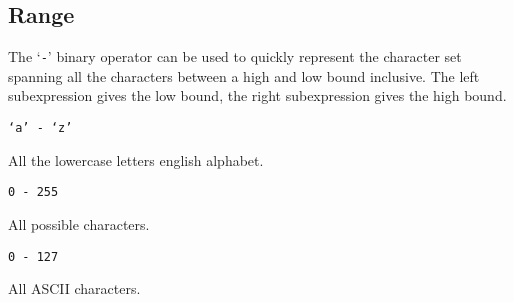 
\subsection{Range}
{
	The `\texttt{-}' binary operator can be used to quickly represent the
	character set
	spanning all the characters between a high and low bound inclusive.
	The left subexpression gives the low bound, the right subexpression gives
	the high bound.
	
	\begin{itemize}
	{
		\item \texttt{`a' - `z'}
		
			All the lowercase letters english alphabet.
		
		\item \texttt{0 - 255}
		
			All possible characters.
		
		\item \texttt{0 - 127}
		
			All ASCII characters.
	}
	\end{itemize}
}
